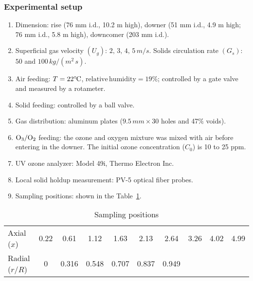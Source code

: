 \subsubsection{Experimental setup}
\begin{enumerate}
    \item Dimension: rise (76 mm i.d., 10.2 m high), 
    downer (51 mm i.d., 4.9 m high; 76 mm i.d., 5.8 m high), 
    downcomer (203 mm i.d.). 

    \item Superficial gas velocity $(U_g)$: $2,\,3,\,4,\,5\,\si{m/s}$. 
    Solids circulation rate $(G_s)$: $50$ and $100\,\si{kg/(m^2\,s)}$.
    
    \item Air feeding: $T = 22 ^\circ\hspace{-0.09em}\mathrm{C}$, $\mathrm{relative\, humidity} = 19\%$; 
    controlled by a gate valve and measured by a rotameter.
    
    \item Solid feeding: controlled by a ball valve.
    
    \item Gas distribution: aluminum plates ($9.5\,\si{mm}\times 30$ holes and 47$\%$ voids).
    
    \item $\mathrm{O_3} / \mathrm{O_2}$ feeding: the ozone and oxygen mixture was mixed with air before entering in the downer. The initial ozone concentration ($C_0$) is 10 to 25 ppm.
    
    \item UV ozone analyzer: Model 49i, Thermo Electron Inc.
    
    \item Local solid holdup measurement: PV-5 optical fiber probes.
    
    \item Sampling positions: shown in the Table~\ref{tab:axial sampling positions}.
\end{enumerate}


\begin{table}[h]
    \centering
    \caption{Sampling positions}
    \label{tab:axial sampling positions}
    \begin{tabular}{lccccccccc}
        \toprule
        Axial ($x$) & 0.22 & 0.61 & 1.12 & 1.63 & 2.13 & 2.64 & 3.26 & 4.02 & 4.99 \\
        Radial ($r/R$) & 0 & 0.316 & 0.548 & 0.707 & 0.837 & 0.949 & & &  \\
        \bottomrule
    \end{tabular}
\end{table}


